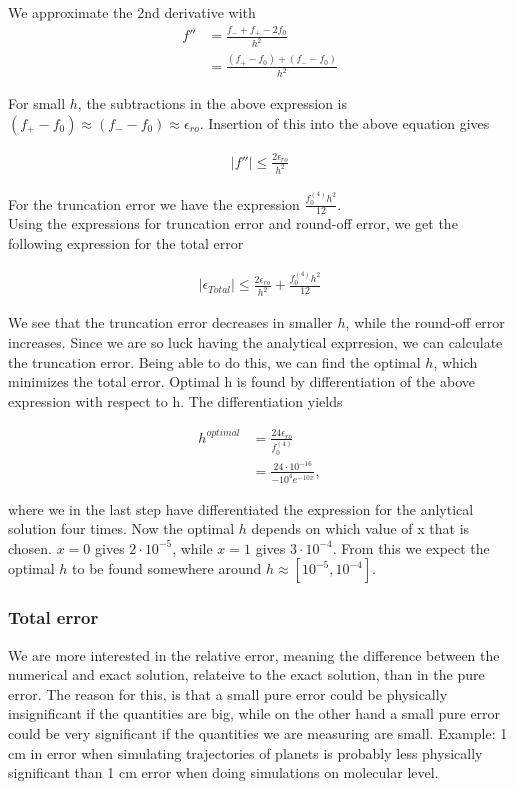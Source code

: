 \documentclass{article}
\begin{document}
We approximate the 2nd derivative with
\begin{align}
f'' &= \frac{f_{-} + f_{+} - 2f_0}{h^2}  \\
&= \frac{(f_{+} - f_0) + (f_{-} - f_0)}{h^2}
\end{align}

For small $h$, the subtractions in the above expression is $ (f_+ - f_0) \approx (f_- - f_0) \approx \epsilon_{ro}$. Insertion of this into the above equation gives

\begin{align}
|f''| \leq \frac{2 \epsilon_{ro}}{h^2}
\end{align}

For the truncation error we have the expression $ \frac{f_0^{(4)}h^2}{12}$.  \\

Using the expressions for truncation error and round-off error, we get the following expression for the total error

\begin{align}
|\epsilon_{Total}| \leq \frac{2 \epsilon_{ro}}{h^2} + \frac{f_0^{(4)}h^2}{12}
\end{align}

We see that the truncation error decreases in smaller $h$, while the round-off error increases. Since we are so luck having the analytical exprresion, we can calculate the truncation error. Being able to do this, we can find the optimal $h$, which minimizes the total error. Optimal h is found by differentiation of the above expression with respect to h. The differentiation yields

\begin{align}
h^{optimal} &= \frac{24 \epsilon_{ro}}{f_0^{(4)}}\\
&= \frac{24 \cdot 10^{-16}}{-10^4 e^{-10x}},
\end{align}

where we in the last step have differentiated the expression for the anlytical solution four times. Now the optimal $h$ depends on which value of x that is chosen. $x = 0$ gives $2\cdot10^{-5}$, while $x = 1$ gives $3 \cdot 10^{-4}$. From this we expect the optimal $h$ to be found somewhere around $h \approx [10^{-5}, 10^{-4}]$.

\subsubsection{Total error}
We are more interested in the relative error, meaning the difference between the numerical and exact solution, relateive to the exact solution, than in the pure error. The reason for this, is that a small pure error could be physically insignificant if the quantities are big, while on the other hand a small pure error could be very significant if the quantities we are measuring are small. Example: 1 cm in error when simulating trajectories of planets is probably less physically significant than 1 cm error when doing simulations on molecular level.\\
\end{document}
